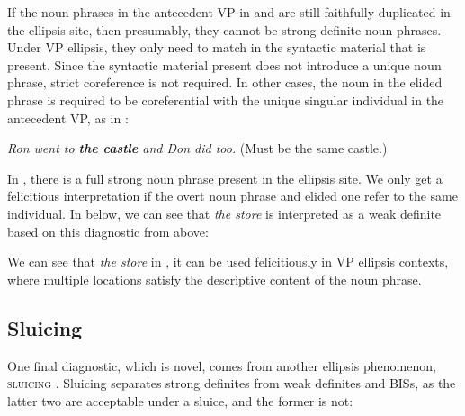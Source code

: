 \documentclass[output=paper,
modfonts
]{langscibook}
\begin{document}
If the noun phrases in the antecedent VP in  and  are still faithfully duplicated in the ellipsis site, then presumably, they cannot be strong definite noun phrases. Under VP ellipsis, they only need to match in the syntactic material that is present. Since the syntactic material present does not introduce a unique noun phrase, strict coreference is not required. In other cases, the noun in the elided phrase is required to be coreferential with the unique singular individual in the antecedent VP, as in :

\begin{exe}
	\ex \label{ex:williams:14}
		\textit{Ron went to \textbf{the castle} and Don did too.}   
		\leavevmode 
		(Must be the same castle.) 
\end{exe}

In , there is a full strong noun phrase present in the ellipsis site. We only get a felicitious interpretation if the overt noun phrase and elided one refer to the same individual. In  below, we can see that \textit{the store} is interpreted as a weak definite based on this diagnostic from above: 

\begin{exe}
\end{exe}

We can see that \textit{the store} in , it can be used felicitiously in VP ellipsis contexts, where multiple locations satisfy the descriptive content of the noun phrase.

\subsection{Sluicing}\label{sec:williams:2.3}

One final diagnostic, which is novel, comes from another ellipsis phenomenon, \textsc{sluicing} \citep{ross1967,ross1969}. Sluicing separates strong definites from weak definites and BISs, as the latter two are acceptable under a sluice, and the former is not:

\begin{exe}
\end{exe}
\end{document}
